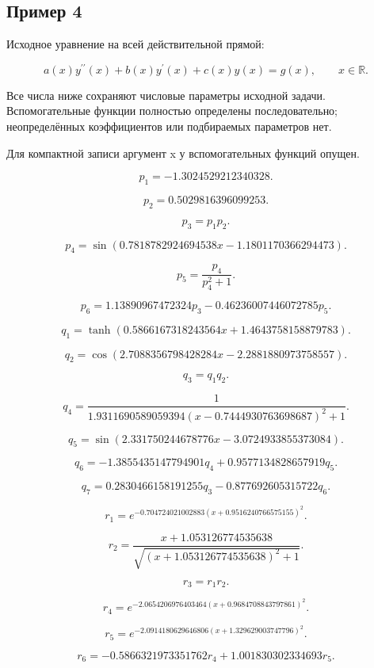 \subsection*{Пример 4}

Исходное уравнение на всей действительной прямой:

\[a(x)y^{\prime\prime}(x)+b(x)y^\prime(x)+c(x)y(x)=g(x),\qquad x\in\mathbb R.\]

Все числа ниже сохраняют числовые параметры исходной задачи. Вспомогательные функции полностью определены последовательно; неопределённых коэффициентов или подбираемых параметров нет.

Для компактной записи аргумент x у вспомогательных функций опущен.

\[p_{1}=-1.3024529212340328.\]

\[p_{2}=0.5029816396099253.\]

\[p_{3}=p_{1} p_{2}.\]

\[p_{4}=\sin{\left(0.7818782924694538 x - 1.1801170366294473 \right)}.\]

\[p_{5}=\frac{p_{4}}{p_{4}^{2} + 1}.\]

\[p_{6}=1.13890967472324 p_{3} - 0.46236007446072785 p_{5}.\]

\[q_{1}=\tanh{\left(0.5866167318243564 x + 1.4643758158879783 \right)}.\]

\[q_{2}=\cos{\left(2.7088356798428284 x - 2.2881880973758557 \right)}.\]

\[q_{3}=q_{1} q_{2}.\]

\[q_{4}=\frac{1}{1.9311690589059394 \left(x - 0.7444930763698687\right)^{2} + 1}.\]

\[q_{5}=\sin{\left(2.331750244678776 x - 3.0724933855373084 \right)}.\]

\[q_{6}=- 1.3855435147794901 q_{4} + 0.9577134828657919 q_{5}.\]

\[q_{7}=0.2830466158191255 q_{3} - 0.877692605315722 q_{6}.\]

\[r_{1}=e^{- 0.704724021002883 \left(x + 0.9516240766575155\right)^{2}}.\]

\[r_{2}=\frac{x + 1.053126774535638}{\sqrt{\left(x + 1.053126774535638\right)^{2} + 1}}.\]

\[r_{3}=r_{1} r_{2}.\]

\[r_{4}=e^{- 2.0654206976403464 \left(x + 0.9684708843797861\right)^{2}}.\]

\[r_{5}=e^{- 2.0914180629646806 \left(x + 1.329629003747796\right)^{2}}.\]

\[r_{6}=- 0.5866321973351762 r_{4} + 1.001830302334693 r_{5}.\]

